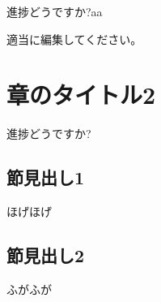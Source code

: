 \documentclass[
]{book}
\begin{document}
進捗どうですか?aa

適当に編集してください。

\hypertarget{ux7ae0ux306eux30bfux30a4ux30c8ux30eb2}{%
\chapter{章のタイトル2}\label{ux7ae0ux306eux30bfux30a4ux30c8ux30eb2}}

進捗どうですか?

\hypertarget{ux7bc0ux898bux51faux30571}{%
\section{節見出し1}\label{ux7bc0ux898bux51faux30571}}

ほげほげ

\hypertarget{ux7bc0ux898bux51faux30572}{%
\section{節見出し2}\label{ux7bc0ux898bux51faux30572}}

ふがふが
\end{document}
